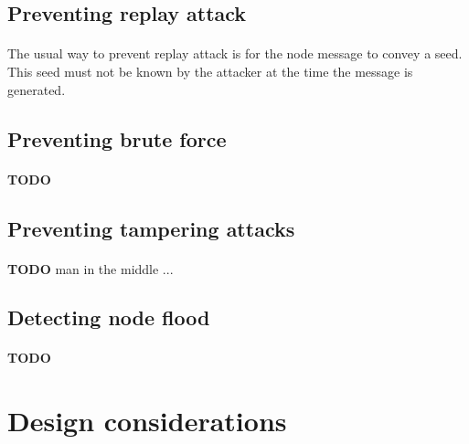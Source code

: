 \documentclass[a4paper, 11pt]{article}
\begin{document}
\subsection{Preventing replay attack}
\paragraph{}
The usual way to prevent replay attack is for the node message to convey
a seed. This seed must not be known by the attacker at the time the message
is generated.

\subsection{Preventing brute force}
\paragraph{}
\textbf{TODO}

\subsection{Preventing tampering attacks}
\paragraph{}
\textbf{TODO} man in the middle ...

\subsection{Detecting node flood}
\paragraph{}
\textbf{TODO}


\clearpage
\section{Design considerations}
\end{document}
